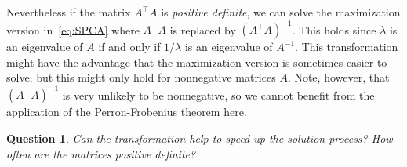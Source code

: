 \documentclass[10pt, a4paper]{article}
\newcommand{\T}{^{\top}}
\newtheorem{question}[theorem]{Question}
\begin{document}
Nevertheless if the matrix $A\T A$ is \emph{positive definite}, we can
solve the maximization version in~\eqref{eq:SPCA} where $A\T A$ is replaced
by $(A\T A)^{-1}$. This holds since $\lambda$ is an eigenvalue of $A$ if
and only if $1/\lambda$ is an eigenvalue of $A^{-1}$. This transformation
might have the advantage that the maximization version is sometimes easier
to solve, but this might only hold for nonnegative matrices $A$. Note,
however, that $(A\T A)^{-1}$ is very unlikely to be nonnegative, so we
cannot benefit from the application of the Perron-Frobenius theorem here.

\begin{question}
  Can the transformation help to speed up the solution process? How often
  are the matrices positive definite?
\end{question}


\begin{small}
  
  
\end{small}
\end{document}
